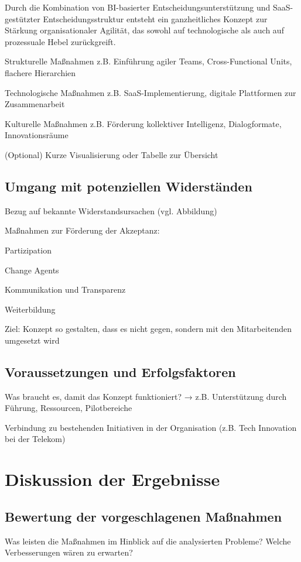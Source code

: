 \documentclass[12pt,a4paper]{article}
\begin{document}
Durch die Kombination von BI-basierter Entscheidungsunterstützung und SaaS-gestützter Entscheidungsstruktur entsteht ein ganzheitliches Konzept zur Stärkung organisationaler Agilität, das sowohl auf technologische als auch auf prozessuale Hebel zurückgreift.
	
	
	
	Strukturelle Maßnahmen
	z.B. Einführung agiler Teams, Cross-Functional Units, flachere Hierarchien
	
	Technologische Maßnahmen
	z.B. SaaS-Implementierung, digitale Plattformen zur Zusammenarbeit
	
	Kulturelle Maßnahmen
	z.B. Förderung kollektiver Intelligenz, Dialogformate, Innovationsräume
	
	(Optional) Kurze Visualisierung oder Tabelle zur Übersicht
	\subsection{Umgang mit potenziellen Widerständen}
	Bezug auf bekannte Widerstandsursachen (vgl. Abbildung)
	
	Maßnahmen zur Förderung der Akzeptanz:
	
	Partizipation
	
	Change Agents
	
	Kommunikation und Transparenz
	
	Weiterbildung
	
	Ziel: Konzept so gestalten, dass es nicht gegen, sondern mit den Mitarbeitenden umgesetzt wird
	
	\subsection{Voraussetzungen und Erfolgsfaktoren}
	Was braucht es, damit das Konzept funktioniert?
	→ z.B. Unterstützung durch Führung, Ressourcen, Pilotbereiche
	
	Verbindung zu bestehenden Initiativen in der Organisation (z.B. Tech  Innovation bei der Telekom)
	
	\section{Diskussion der Ergebnisse}
	\subsection{Bewertung der vorgeschlagenen Maßnahmen}
	
	Was leisten die Maßnahmen im Hinblick auf die analysierten Probleme?
	Welche Verbesserungen wären zu erwarten?
\end{document}
